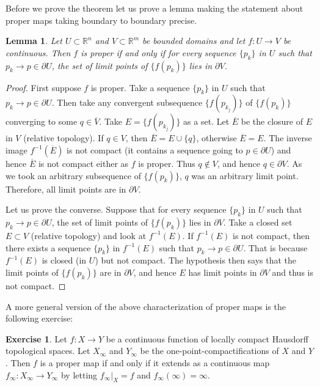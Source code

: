 \documentclass[12pt,openany]{book}
\newcommand{\R}{{\mathbb{R}}}
\theoremstyle{plain}
\newtheorem{lemma}[thm]{Lemma}
\theoremstyle{remark}
\theoremstyle{definition}
\newenvironment{exbox}{%
    \def\FrameCommand{\vrule width 1pt \relax\hspace {10pt}}%
    \MakeFramed {\advance \hsize -\width \FrameRestore }%
}{%
    \endMakeFramed
}
\theoremstyle{exercise}
\newtheorem{exercise}{Exercise}[section]
\theoremstyle{example}
\begin{document}
Before we prove the theorem let us prove a lemma making the statement about
proper maps taking boundary to boundary precise.

\begin{lemma} \label{lemma:bndrytobndry}
Let $U \subset \R^n$ and $V \subset \R^m$ be bounded domains and
let $f \colon U \to V$ be continuous.
Then $f$ is proper if and only if
for every sequence $\{ p_k \}$ in $U$ such that $p_k \to p \in \partial U$,
the set of limit points of $\{ f(p_k) \}$ lies in $\partial V$.
\end{lemma}

\begin{proof}
First suppose $f$ is proper.  Take a 
sequence $\{ p_k \}$ in $U$ such that $p_k \to p \in \partial U$.
Then take any convergent subsequence $\{ f(p_{k_j}) \}$ of $\{ f(p_k) \}$
converging to some $q \in \overline{V}$.  Take
$E = \{ f(p_{k_j}) \}$ as a set.  Let $\overline{E}$ be the closure of $E$
in $V$ (relative topology).  If $q \in V$, then $\overline{E} = E \cup \{ q \}$, otherwise
$\overline{E} = E$.
The inverse image $f^{-1}(\overline{E})$
is not compact (it contains a sequence going to $p \in \partial U$)
and hence $\overline{E}$ is not
compact either as $f$ is proper.  Thus $q \notin V$, and hence $q \in
\partial V$.  As we took an arbitrary subsequence of $\{ f(p_k) \}$, $q$ was
an arbitrary limit point.  Therefore, all limit points are in $\partial V$.

Let us prove the converse.
Suppose that for every sequence
$\{ p_k \}$ in $U$ such that $p_k \to p \in \partial U$,
the set of limit points of $\{ f(p_k) \}$ lies in $\partial V$.
Take a closed set $E \subset V$ (relative topology) and look at $f^{-1}(E)$.  If $f^{-1}(E)$
is not compact, then there exists a sequence $\{ p_k \}$ in $f^{-1}(E)$
such that $p_k \to p \in \partial U$.  That is because $f^{-1}(E)$ is closed
(in $U$) but not compact.  The hypothesis then says that the limit points of
$\{ f(p_k) \}$ are in $\partial V$, and hence $E$ has limit points in
$\partial V$ and thus is not compact.
\end{proof}

A more general version of the above characterization of proper maps is the following exercise:

\begin{exbox}
\begin{exercise}
Let $f \colon X \to Y$ be a continuous function of locally compact Hausdorff topological spaces.
Let $X_\infty$ and $Y_\infty$ be the 
one-point-compactifications of $X$ and $Y$.
Then $f$ is a proper map if and only if it extends as a continuous map
$f_\infty \colon X_\infty \to Y_\infty$ by letting
$f_\infty |_X = f$ and
 $f_\infty(\infty) = \infty$.
\end{exercise}
\end{exbox}
\end{document}
